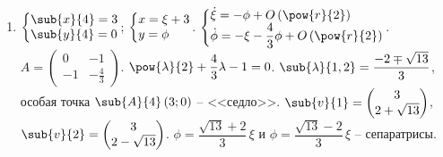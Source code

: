 \documentclass[a5paper,10pt]{article}
\begin{document}
\begin{enumerate}
    \item $\tsys{\sub{x}{4} = 3 \\ \sub{y}{4} = 0}$;
    $\tsys{x = \xi + 3 \\ y = \phi}$.
    $\tsys{
        \dot{\xi} = -\phi + O\br{\pow{r}{2}} 
        \\ \dot{\phi} = -\xi - \dfrac {4} {3} \phi + O\br{\pow{r}{2}}
    }$. \\
    $A = \begin{pmatrix} 0 & -1 \\ -1 & -\frac {4} {3} \end{pmatrix}$.
    $\pow{\lambda}{2} + \dfrac {4} {3} \lambda - 1 = 0$.
    $\sub{\lambda}{1, 2} = \dfrac {-2 \mp \sqrt{13}} {3}$,
    особая точка $\sub{A}{4}\br{3; 0}$ -- <<седло>>.
    $\sub{v}{1} = \begin{pmatrix} 3 \\ 2 + \sqrt{13} \end{pmatrix}$,
    $\sub{v}{2} = \begin{pmatrix} 3 \\ 2 - \sqrt{13} \end{pmatrix}$. 
    $\phi = \dfrac {\sqrt{13} + 2} {3}\,\xi$ и
    $\phi = \dfrac {\sqrt{13} - 2} {3}\,\xi$ -- сепаратрисы.
\end{enumerate}
\end{document}
